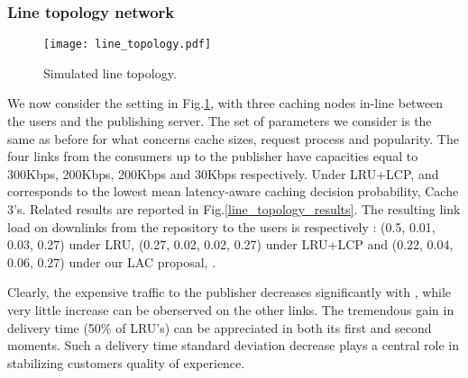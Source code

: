 \documentclass[conference]{IEEEtran}
\begin{document}
\subsubsection{Line topology network}
\begin{figure}[htbp] 
\centering
\texttt{[image: line\_topology.pdf]}
\vspace{-1cm}
\caption{Simulated line topology.} 
\label{fig:line_topology} 
\end{figure}
We now consider the setting in Fig.\ref{fig:line_topology}, with three caching nodes in-line
between the users and the publishing server. 
The set of parameters we consider is the same as before for what concerns cache sizes, request process and popularity. 
The four links from the consumers up to the
publisher have capacities equal to 300Kbps, 200Kbps, 200Kbps and 30Kbps respectively. 
Under LRU+LCP,   and corresponds to the lowest mean latency-aware caching decision probability, Cache 3's. 
Related results are reported in Fig.\ref{line_topology_results}.
The resulting link load  on downlinks from the repository to the users is respectively : (0.5, 0.01, 0.03, 0.27) under LRU,
(0.27, 0.02, 0.02, 0.27) under LRU+LCP and (0.22, 0.04, 0.06, 0.27) under our LAC proposal, . 
\begin{figure*}[ht] 
\centering
{}
\caption{Line topology simulation: LAasym decreases  LRU delivery time by 50\% and outperforms LRU+LCP on convergence.}
\label{line_topology_results}
\end{figure*} 
Clearly, the expensive traffic to the publisher decreases significantly with , while very little increase can be oberserved on the other links. The tremendous gain in delivery time (50\% of LRU's) can be appreciated in both its first and second moments. Such a delivery time standard deviation decrease plays a central role in stabilizing customers quality of experience.
\end{document}
